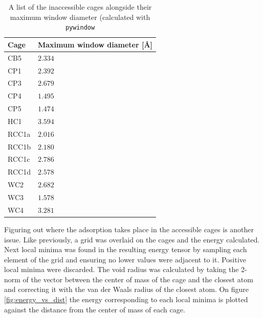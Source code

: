 \documentclass[journal=jacsat,manuscript=article]{achemso}
\begin{document}
{\begin{table}
  \caption{\color{red}A list of the inaccessible cages alongside their maximum window diameter (calculated with \texttt{pywindow}}
  \label{tbl:inaccessible}
  \begin{tabular}{lp{3.5cm}}
    \hline
    \textbf{Cage}  & \textbf{Maximum window diameter [\AA]}  \\
    \hline
    CB5 & $2.334$ \\
    CP1 & $2.392$ \\
    CP3 & $2.679$ \\
    CP4 & $1.495$ \\
	CP5 & $1.474$ \\
    HC1 & $3.594$ \\
    RCC1a & $2.016$ \\
    RCC1b & $2.180$ \\
    RCC1c & $2.786$ \\
	RCC1d & $2.578$ \\
	WC2 & $2.682$ \\
	WC3 & $1.578$ \\
	WC4 & $3.281$ \\
    \hline
  \end{tabular}
\end{table}


Figuring out where the adsorption takes place in the accessible cages is another issue. Like previously, a grid was overlaid on the cages and the energy calculated. Next local minima was found in the resulting energy tensor by sampling each element of the grid and ensuring no lower values were adjacent to it. Positive local minima were discarded. The void radius was calculated by taking the 2-norm of the vector between the center of mass of the cage and the closest atom and correcting it with the van der Waals radius of the closest atom. On figure \ref{fig:energy_vs_dist} the energy corresponding to each local minima is plotted against the distance from the center of mass of each cage.}
\end{document}
